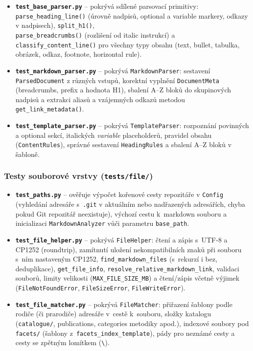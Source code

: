\documentclass[12pt, a4paper]{article}
\begin{document}
\begin{itemize}
    \item \textbf{\texttt{test\_base\_parser.py}} -- pokrývá sdílené parsovací primitivy:
    \texttt{parse\_heading\_line()} (úrovně nadpisů, optional a variable markery,
    odkazy v nadpisech), \texttt{split\_h1()}, \\ \texttt{parse\_breadcrumbs()}
    (rozlišení od italic instrukcí) a \texttt{classify\_content\_line()} pro všechny
    typy obsahu (text, bullet, tabulka, obrázek, odkaz, footnote, horizontal rule).

    \item \textbf{\texttt{test\_markdown\_parser.py}} -- pokrývá \texttt{MarkdownParser}:
    sestavení \texttt{ParsedDocument} z různých vstupů, korektní vyplnění
    \texttt{DocumentMeta} (breadcrumbs, prefix a hodnota H1), sbalení A--Z bloků
    do skupinových nadpisů a extrakci aliasů a vzájemných odkazů metodou
    \texttt{get\_link\_metadata()}.

    \item \textbf{\texttt{test\_template\_parser.py}} -- pokrývá \texttt{TemplateParser}:
    rozpoznání povinných a optional sekcí, italických \emph{variable} placeholderů,
    pravidel obsahu (\texttt{ContentRules}), správné sestavení \texttt{HeadingRules}
    a sbalení A--Z bloků v šabloně.
\end{itemize}

\subsubsection*{Testy souborové vrstvy (\texttt{tests/file/})}

\begin{itemize}
    \item \textbf{\texttt{test\_paths.py}} --
    ověřuje výpočet kořenové cesty repozitáře v \texttt{Config} (vyhledání adresáře
    s~\texttt{.git} v aktuálním nebo nadřazených adresářích, chyba pokud Git repozitář neexistuje),
    výchozí cestu k~markdown souboru a inicializaci \texttt{MarkdownAnalyzer} vůči parametru \texttt{base\_path}.

    \item \textbf{\texttt{test\_file\_helper.py}} --
    pokrývá \texttt{FileHelper}: čtení a zápis s~UTF-8 a CP1252 (roundtrip),
    zamítnutí uložení nekompatibilních znaků při souboru s~ním nastaveným CP1252,
    \texttt{find\_markdown\_files} (s~rekurzí i bez, deduplikace),
    \texttt{get\_file\_info}, \texttt{resolve\_relative\_markdown\_link}, validaci souborů,
    limity velikosti (\texttt{MAX\_FILE\_SIZE\_MB}) a čtení/zápis včetně výjimek
    (\texttt{FileNotFoundError}, \texttt{FileSizeError}, \texttt{FileWriteError}).

    \item \textbf{\texttt{test\_file\_matcher.py}} --
    pokrývá \texttt{FileMatcher}: přiřazení šablony podle rodiče (či prarodiče) adresáře v~cestě k~souboru,
    složky katalogu (\texttt{catalogue/}, publications, categories metodiky apod.), indexové soubory
    pod \texttt{facets/} (šablony z~\texttt{facets\_index\_template}), pády pro neznámé cesty
    a cesty se zpětným lomítkem (\texttt{\textbackslash}).
\end{itemize}
\end{document}

